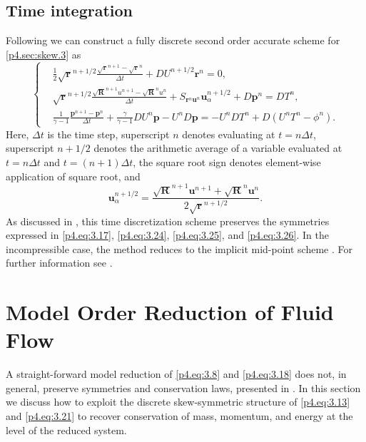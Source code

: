\subsection{Time integration}
Following \cite{reiss2014conservative,morinishi2010skew} we can construct a fully discrete second order accurate scheme for \eqref{p4.sec:skew.3} as
\begin{equation} \label{p4.eq:3.27}
	\left\{
	\begin{aligned}
	&\frac 1 2 \sqrt{\mathbf r} ^{n+1/2} \frac{\sqrt{\mathbf r}^{n+1} - \sqrt{\mathbf r}^{n}}{\Delta t} + DU^{n+1/2} \mathbf r^{n} = 0, \\
	& \sqrt{\mathbf r} ^{n+1/2}  \frac{\sqrt{ \mathbf R}^{n+1} u^{n+1} - \sqrt{\mathbf R}^{n}u^n}{\Delta t} + S_{\mathbf r^{n} \mathbf u^n} \mathbf u^{n+1/2}_\alpha + D \mathbf p^{n} = DT^{n}, \\
	& \frac 1 {\gamma -1} \frac{\mathbf p^{n+1} - \mathbf p^n}{\Delta t} + \frac{\gamma}{\gamma -1} D U^{n} \mathbf p - U^{n} D \mathbf p = - U^{n}D T^{n} + D (U^nT^n - \phi^n).
	\end{aligned}
	\right.
\end{equation}
Here, $\Delta t$ is the time step, superscript $n$ denotes evaluating at $t = n\Delta t$, superscript $n+1/2$ denotes the arithmetic average of a variable evaluated at $t=n\Delta t$ and $t=(n+1)\Delta t$, the square root sign denotes element-wise application of square root, and 
\begin{equation}
	\mathbf u_{\alpha}^{n+1/2} = \frac{\sqrt{\mathbf R}^{n+1} \mathbf u^{n+1} + \sqrt{\mathbf R}^{n} \mathbf u^{n}}{2\sqrt{\mathbf r}^{n+1/2} }.
\end{equation}
As discussed in \cite{reiss2014conservative}, this time discretization scheme preserves the symmetries expressed in \eqref{p4.eq:3.17}, \eqref{p4.eq:3.24}, \eqref{p4.eq:3.25}, and \eqref{p4.eq:3.26}. In the incompressible case, the method reduces to the implicit mid-point scheme \cite{hairer2006geometric}. For further information see \cite{reiss2014conservative,morinishi2010skew}.

\section{Model Order Reduction of Fluid Flow} \label{p4.sec:mor_skew}
A straight-forward model reduction of \eqref{p4.eq:3.8} and \eqref{p4.eq:3.18} does not, in general, preserve symmetries and conservation laws, presented in . In this section we discuss how to exploit the discrete skew-symmetric structure of \eqref{p4.eq:3.13} and \eqref{p4.eq:3.21} to recover conservation of mass, momentum, and energy at the level of the reduced system.

